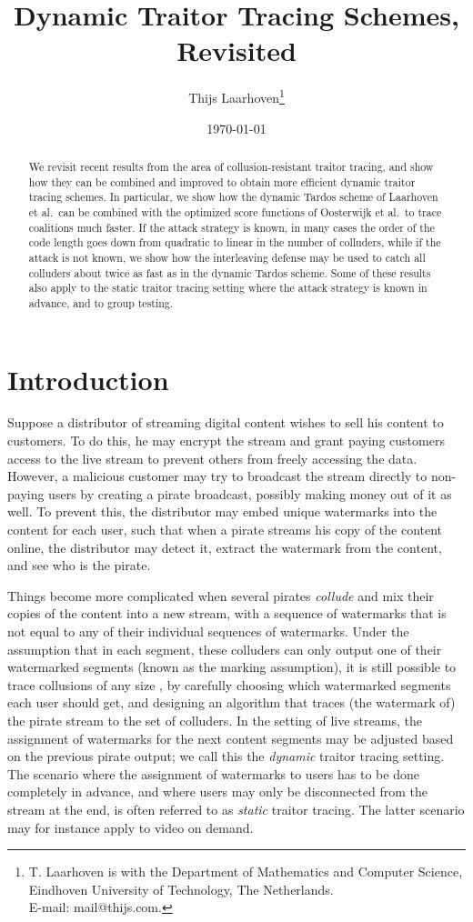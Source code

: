 \documentclass[10pt,a4paper,twocolumn]{article}
\title{Dynamic Traitor Tracing Schemes, Revisited}
\author{Thijs Laarhoven\footnote{T. Laarhoven is with the Department of Mathematics and Computer Science, Eindhoven University of Technology, The Netherlands. \protect\\
E-mail: mail@thijs.com.}}
\date{\today}
\begin{document}
\maketitle

\begin{abstract}
We revisit recent results from the area of collusion-resistant traitor tracing, and show how they can be combined and improved to obtain more efficient dynamic traitor tracing schemes. In particular, we show how the dynamic Tardos scheme of Laarhoven et al.\ can be combined with the optimized score functions of Oosterwijk et al.\ to trace coalitions much faster. If the attack strategy is known, in many cases the order of the code length goes down from quadratic to linear in the number of colluders, while if the attack is not known, we show how the interleaving defense may be used to catch all colluders about twice as fast as in the dynamic Tardos scheme. Some of these results also apply to the static traitor tracing setting where the attack strategy is known in advance, and to group testing.
\end{abstract}




\section{Introduction}
\label{sec:intro}

Suppose a distributor of streaming digital content wishes to sell his content to customers. To do this, he may encrypt the stream and grant paying customers access to the live stream to prevent others from freely accessing the data. However, a malicious customer may try to broadcast the stream directly to non-paying users by creating a pirate broadcast, possibly making money out of it as well. To prevent this, the distributor may embed unique watermarks into the content for each user, such that when a pirate streams his copy of the content online, the distributor may detect it, extract the watermark from the content, and see who is the pirate. 

Things become more complicated when several pirates \textit{collude} and mix their copies of the content into a new stream, with a sequence of watermarks that is not equal to any of their individual sequences of watermarks. Under the assumption that in each segment, these colluders can only output one of their watermarked segments (known as the marking assumption), it is still possible to trace collusions of any size , by carefully choosing which watermarked segments each user should get, and designing an algorithm that traces (the watermark of) the pirate stream to the set of colluders. In the setting of live streams, the assignment of watermarks for the next content segments may be adjusted based on the previous pirate output; we call this the \textit{dynamic} traitor tracing setting. The scenario where the assignment of watermarks to users has to be done completely in advance, and where users may only be disconnected from the stream at the end, is often referred to as \textit{static} traitor tracing. The latter scenario may for instance apply to video on demand. 
\end{document}
